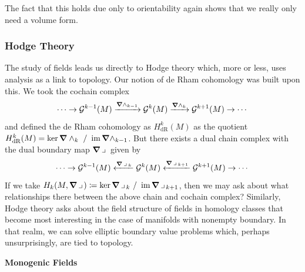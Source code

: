 \documentclass{article}
\begin{document}
\begin{remark}
The fact that this holds due only to orientability again shows that we really only need a volume form.
\end{remark}


\subsubsection{Hodge Theory}


The study of fields leads us directly to Hodge theory which, more or less, uses analysis as a link to topology. Our notion of de Rham cohomology was built upon this. We took the cochain complex
\begin{equation}
\cdots \to \mathcal{G}^{k-1}(M) \xrightarrow{\boldsymbol{\nabla} \wedge_{k-1}} \mathcal{G}^k(M) \xrightarrow{\boldsymbol{\nabla} \wedge_{k}} \mathcal{G}^{k+1}(M) \to \cdots
\end{equation}
and defined the de Rham cohomology as $H^k_{\mathrm{dR}}(M)$ as the quotient $H^k_{\mathrm{dR}}(M) = \ker \boldsymbol{\nabla} \wedge_k ~ / ~ \operatorname{im} \boldsymbol{\nabla} \wedge_{k-1}$. But there exists a dual chain complex with the dual boundary map $\boldsymbol{\nabla} \hspace*{.5mm}\lrcorner \hspace*{.5mm}$ given by
\begin{equation}
\cdots \to \mathcal{G}^{k-1}(M) \xleftarrow{\boldsymbol{\nabla} \hspace*{.5mm}\lrcorner \hspace*{.5mm}_{k}} \mathcal{G}^k(M) \xleftarrow{\boldsymbol{\nabla} \hspace*{.5mm}\lrcorner \hspace*{.5mm}_{k+1}} \mathcal{G}^{k+1}(M) \to \cdots
\end{equation}
If we take $H_k(M,\boldsymbol{\nabla} \hspace*{.5mm}\lrcorner \hspace*{.5mm})\coloneqq \ker \boldsymbol{\nabla} \hspace*{.5mm}\lrcorner \hspace*{.5mm}_k ~ / ~ \operatorname{im} \boldsymbol{\nabla} \hspace*{.5mm}\lrcorner \hspace*{.5mm}_{k+1}$, then we may ask about what relationships there between the above chain and cochain complex? Similarly, Hodge theory asks about the field structure of fields in homology classes that become most interesting in the case of manifolds with nonempty boundary. In that realm, we can solve elliptic boundary value problems which, perhaps unsurprisingly, are tied to topology.

\noindent \textbf{Monogenic Fields}
\end{document}
